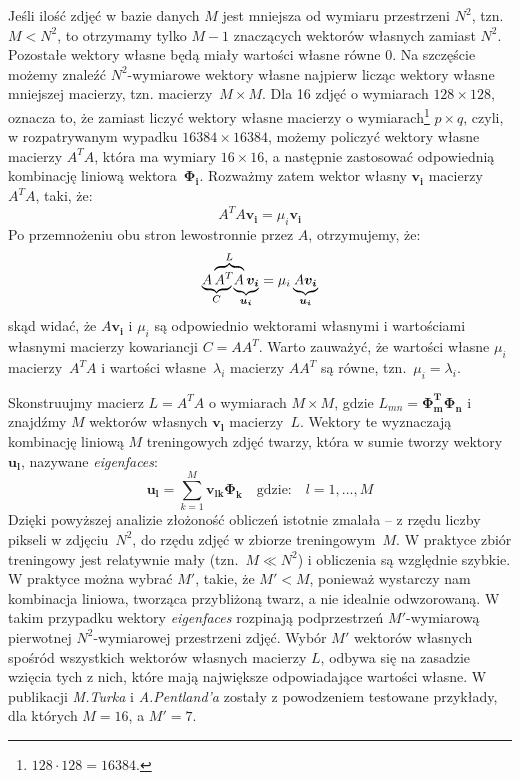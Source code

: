 \documentclass[a4paper,titlepage]{article}
\theoremstyle{break}
\numberwithin{equation}{subsection}
\begin{document}
Jeśli ilość zdjęć w bazie danych $M$ jest mniejsza od wymiaru przestrzeni $N^2$, tzn. $M<N^2$, to otrzymamy tylko $M-1$ znaczących wektorów własnych zamiast $N^2$. Pozostałe wektory własne będą miały wartości własne równe $0$. Na szczęście możemy znaleźć $N^2$-wymiarowe wektory własne najpierw licząc wektory własne mniejszej macierzy, tzn. macierzy~$M\times M$. Dla 16 zdjęć o wymiarach $128\times 128$, oznacza to, że zamiast liczyć wektory własne macierzy o wymiarach\footnote{$128\cdot 128=16384$.} $p\times q$, czyli, w rozpatrywanym wypadku $16384\times 16384$, możemy policzyć wektory własne macierzy $A^TA$, która ma wymiary $16\times 16$, a następnie zastosować odpowiednią kombinację liniową wektora~$\bm{\Phi_i}$. Rozważmy zatem wektor własny $\bm{v_i}$ macierzy $A^TA$, taki, że:
\begin{equation}
	A^TA\bm{v_i}=\mu_i\bm{v_i}
\end{equation}
Po przemnożeniu obu stron lewostronnie przez $A$, otrzymujemy, że:
\begin{equation}
	\mathrlap{
		\underbrace{
			\phantom{AA^T}
		}_C
	}A\overbrace{
		A^T\mathrlap{
			\underbrace{\phantom{A\bm{v_i}}}_{\bm{u_i}}
		}A
	}^L\bm{v_i}
	=\mu_i\underbrace{A\bm{v_i}}_{\bm{u_i}}
\end{equation}
skąd widać, że $A\bm{v_i}$ i $\mu_i$ są odpowiednio wektorami własnymi i wartościami własnymi macierzy kowariancji $C=AA^T$. Warto zauważyć, że wartości własne $\mu_i$ macierzy~$A^TA$ i wartości własne~$\lambda_i$ macierzy $AA^T$ są równe, tzn.~$\mu_i =\lambda_i$.

Skonstruujmy macierz $L=A^TA$ o wymiarach $M\times M$, gdzie $L_{mn}=\bm{\Phi_m^T}\bm{\Phi_n}$ i znajdźmy $M$ wektorów własnych $\bm{v_l}$ macierzy~$L$. Wektory te wyznaczają kombinację liniową $M$ treningowych zdjęć twarzy, która w sumie tworzy wektory $\bm{u_l}$, nazywane \emph{eigenfaces}:
\begin{equation}
\label{eq:eigenfaces}
	\bm{u_l}=\sum\limits_{k=1}^M\bm{v_{lk}}\bm{\Phi_k}\quad\text{gdzie:}\quad l=1,\dotsc,M
\end{equation}
Dzięki powyższej analizie złożoność obliczeń istotnie zmalała -- z rzędu liczby pikseli w zdjęciu~$N^2$, do rzędu zdjęć w zbiorze treningowym~$M$. W praktyce zbiór treningowy jest relatywnie mały (tzn.~$M\ll N^2$) i obliczenia są względnie szybkie. W praktyce można wybrać $M'$, takie, że $M'<M$, ponieważ wystarczy nam kombinacja liniowa, tworząca przybliżoną twarz, a nie idealnie odwzorowaną. W takim przypadku wektory \emph{eigenfaces} rozpinają podprzestrzeń $M'$-wymiarową pierwotnej $N^2$-wymiarowej przestrzeni zdjęć. Wybór $M'$ wektorów własnych spośród wszystkich wektorów własnych macierzy $L$, odbywa się na zasadzie wzięcia tych z nich, które mają największe odpowiadające wartości własne. W publikacji \emph{M.Turka} i \emph{A.Pentland'a} zostały z powodzeniem testowane przykłady, dla których $M=16$, a $M'=7$\cite{turk}.
\end{document}
